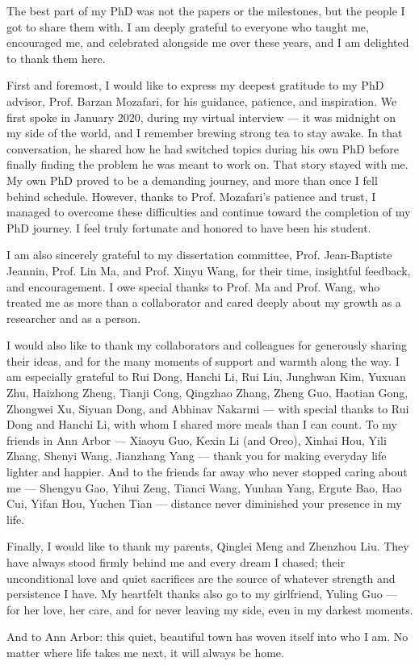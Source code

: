 The best part of my PhD was not the papers or the milestones, but the people I got to share them with. I am deeply grateful to everyone who taught me, encouraged me, and celebrated alongside me over these years, and I am delighted to thank them here.

First and foremost, I would like to express my deepest gratitude to my PhD advisor, Prof.
Barzan Mozafari, for his guidance, patience, and inspiration. We first spoke in January 2020, during my virtual interview — it was midnight on my side of the world, and I remember brewing strong tea to stay awake. In that conversation, he shared how he had switched topics during his own PhD before finally finding the problem he was meant to work on. That story stayed with me. My own PhD proved to be a demanding journey, and more than once I fell behind schedule. However, thanks to Prof. Mozafari’s patience and trust, I managed to overcome
these difficulties and continue toward the completion of my PhD journey. I feel truly fortunate and honored to have been his student. 

I am also sincerely grateful to my dissertation committee, Prof. Jean-Baptiste Jeannin, Prof. Lin Ma, and Prof. Xinyu Wang, for their time, insightful feedback, and encouragement. I owe special thanks to Prof. Ma and Prof. Wang, who treated me as more than a collaborator and cared deeply about my growth as a researcher and as a person.

I would also like to thank my collaborators and colleagues for generously sharing their ideas, and for the many moments of support and warmth along the way. I am especially grateful to Rui Dong, Hanchi Li, Rui Liu, Junghwan Kim, Yuxuan Zhu, Haizhong Zheng, Tianji Cong, Qingzhao Zhang, Zheng Guo, Haotian Gong, Zhongwei Xu, Siyuan Dong, and Abhinav Nakarmi — with special thanks to Rui Dong and Hanchi Li, with whom I shared more meals than I can count. To my friends in Ann Arbor — Xiaoyu Guo, Kexin Li (and Oreo), Xinhai Hou, Yili Zhang, Shenyi Wang, Jianzhang Yang — thank you for making everyday life lighter and happier. And to the friends far away who never stopped caring about me — Shengyu Gao, Yihui Zeng, Tianci Wang,  Yunhan Yang, Ergute Bao, Hao Cui, Yifan Hou, Yuchen Tian — distance never diminished your presence in my life.

Finally, I would like to thank my parents, Qinglei Meng and Zhenzhou Liu. 
They have always stood firmly behind me and every dream I chased; their unconditional love and quiet sacrifices are the source of whatever strength and persistence I have. My heartfelt thanks also go to my girlfriend, Yuling Guo — for her love, her care, and for never leaving my side, even in my darkest moments.

And to Ann Arbor: this quiet, beautiful town has woven itself into who I am. No matter where life takes me next, it will always be home.

